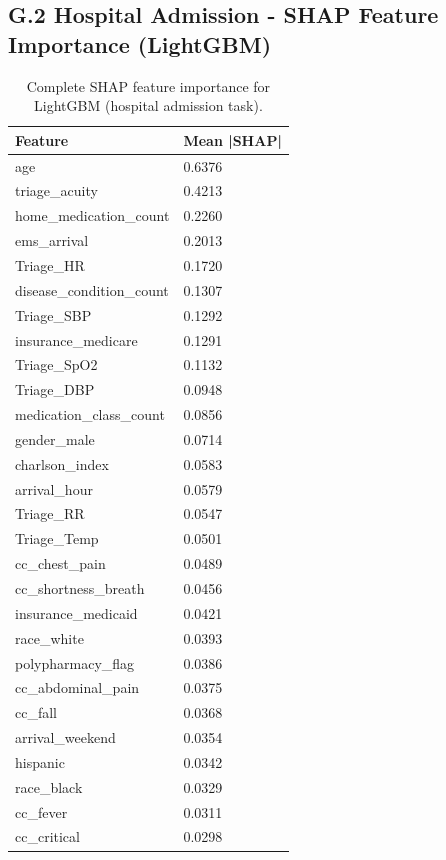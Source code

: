 \documentclass[11pt]{article}
\begin{document}
\subsection{G.2 Hospital Admission - SHAP Feature Importance (LightGBM)}

\begin{table}[H]
\centering
\caption{Complete SHAP feature importance for LightGBM (hospital admission task).}
\begin{tabular}{@{}ll@{}}
\toprule
\textbf{Feature} & \textbf{Mean |SHAP|} \\
\midrule
age & 0.6376 \\
triage\_acuity & 0.4213 \\
home\_medication\_count & 0.2260 \\
ems\_arrival & 0.2013 \\
Triage\_HR & 0.1720 \\
disease\_condition\_count & 0.1307 \\
Triage\_SBP & 0.1292 \\
insurance\_medicare & 0.1291 \\
Triage\_SpO2 & 0.1132 \\
Triage\_DBP & 0.0948 \\
medication\_class\_count & 0.0856 \\
gender\_male & 0.0714 \\
charlson\_index & 0.0583 \\
arrival\_hour & 0.0579 \\
Triage\_RR & 0.0547 \\
Triage\_Temp & 0.0501 \\
cc\_chest\_pain & 0.0489 \\
cc\_shortness\_breath & 0.0456 \\
insurance\_medicaid & 0.0421 \\
race\_white & 0.0393 \\
polypharmacy\_flag & 0.0386 \\
cc\_abdominal\_pain & 0.0375 \\
cc\_fall & 0.0368 \\
arrival\_weekend & 0.0354 \\
hispanic & 0.0342 \\
race\_black & 0.0329 \\
cc\_fever & 0.0311 \\
cc\_critical & 0.0298 \\
\bottomrule
\end{tabular}
\end{table}
\end{document}
